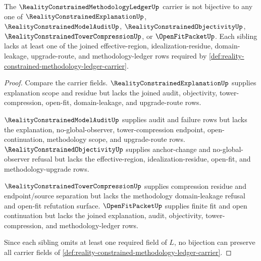\begin{theorem}
\label{thm:reality-constrained-methodology-ledger-sibling-independence}
The $\RealityConstrainedMethodologyLedgerUp$ carrier is not bijective to any one of $\RealityConstrainedExplanationUp$, $\RealityConstrainedModelAuditUp$, $\RealityConstrainedObjectivityUp$, $\RealityConstrainedTowerCompressionUp$, or $\OpenFitPacketUp$. Each sibling lacks at least one of the joined effective-region, idealization-residue, domain-leakage, upgrade-route, and methodology-ledger rows required by \autoref{def:reality-constrained-methodology-ledger-carrier}.
\end{theorem}
\begin{proof}
Compare the carrier fields. $\RealityConstrainedExplanationUp$ supplies explanation scope and residue but lacks the joined audit, objectivity, tower-compression, open-fit, domain-leakage, and upgrade-route rows.

$\RealityConstrainedModelAuditUp$ supplies audit and failure rows but lacks the explanation, no-global-observer, tower-compression endpoint, open-continuation, methodology scope, and upgrade-route rows. $\RealityConstrainedObjectivityUp$ supplies anchor-change and no-global-observer refusal but lacks the effective-region, idealization-residue, open-fit, and methodology-upgrade rows.

$\RealityConstrainedTowerCompressionUp$ supplies compression residue and endpoint/source separation but lacks the methodology domain-leakage refusal and open-fit refutation surface. $\OpenFitPacketUp$ supplies finite fit and open continuation but lacks the joined explanation, audit, objectivity, tower-compression, and methodology-ledger rows.

Since each sibling omits at least one required field of $L$, no bijection can preserve all carrier fields of \autoref{def:reality-constrained-methodology-ledger-carrier}.
\end{proof}

